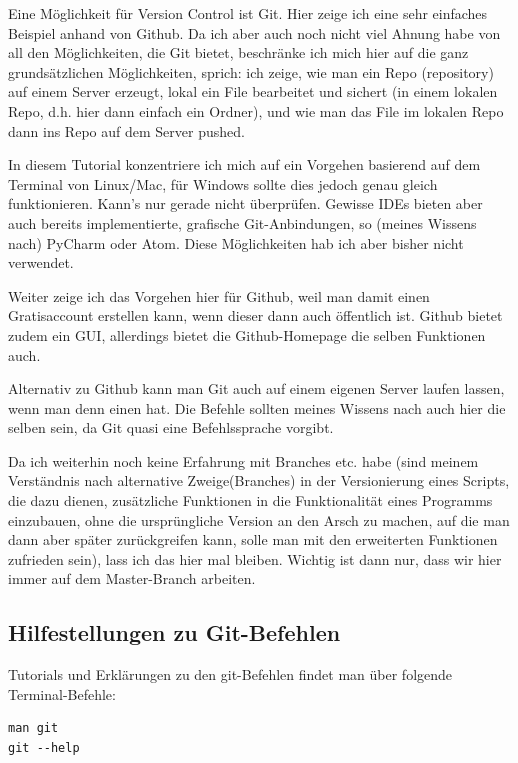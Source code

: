 \documentclass[twoside, 11pr]{article}
\begin{document}
Eine Möglichkeit für Version Control ist Git. Hier zeige ich eine sehr einfaches Beispiel anhand von Github. Da ich aber auch noch nicht viel Ahnung habe von all den Möglichkeiten, die Git bietet, beschränke ich mich hier auf die ganz grundsätzlichen Möglichkeiten, sprich: ich zeige, wie man ein Repo (repository) auf einem Server erzeugt, lokal ein File bearbeitet und sichert (in einem lokalen Repo, d.h. hier dann einfach ein Ordner), und wie man das File im lokalen Repo dann ins Repo auf dem Server pushed. \par
In diesem Tutorial konzentriere ich mich auf ein Vorgehen basierend auf dem Terminal von Linux/Mac, für Windows sollte dies jedoch genau gleich funktionieren. Kann's nur gerade nicht überprüfen. Gewisse IDEs bieten aber auch bereits implementierte, grafische Git-Anbindungen, so (meines Wissens nach) PyCharm oder Atom. Diese Möglichkeiten hab ich aber bisher nicht verwendet.\par
Weiter zeige ich das Vorgehen hier für Github, weil man damit einen Gratisaccount erstellen kann, wenn dieser dann auch öffentlich ist. Github bietet zudem ein GUI, allerdings bietet die Github-Homepage die selben Funktionen auch. \par
Alternativ zu Github kann man Git auch auf einem eigenen Server laufen lassen, wenn man denn einen hat. Die Befehle sollten meines Wissens nach auch hier die selben sein, da Git quasi eine Befehlssprache vorgibt.
\newline
\par
Da ich weiterhin noch keine Erfahrung mit Branches etc. habe (sind meinem Verständnis nach alternative \glqq Zweige\grqq (Branches) in der Versionierung eines Scripts, die dazu dienen, zusätzliche Funktionen in die Funktionalität eines Programms einzubauen, ohne die ursprüngliche Version an den Arsch zu machen, auf die man dann aber später zurückgreifen kann, solle man mit den erweiterten Funktionen zufrieden sein), lass ich das hier mal bleiben. Wichtig ist dann nur, dass wir hier immer auf dem Master-Branch arbeiten.

\subsection{Hilfestellungen zu Git-Befehlen}

Tutorials und Erklärungen zu den git-Befehlen findet man über folgende Terminal-Befehle:

\begin{lstlisting}
man git
git --help
\end{lstlisting}
\end{document}
